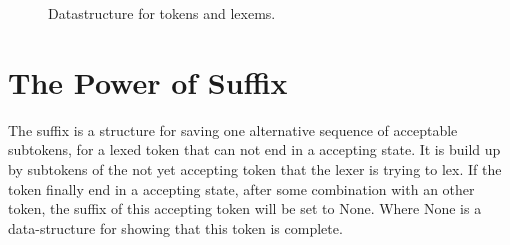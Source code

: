 \begin{figure}[h!]
  \centering
  
  \caption{Datastructure for tokens and lexems. 
  \label{fig:DataStruct}}
\end{figure} 

\section{The Power of Suffix
\label{section:Suffix}}
The suffix is a structure for saving one alternative sequence of acceptable subtokens, for a lexed token that can not end in a accepting state. It is build up by subtokens of the not yet accepting token that the lexer is trying to lex. If the token finally end in a accepting state, after some combination with an other token, the suffix of this accepting token will be set to None. Where None is a data-structure for showing that this token is complete. 

